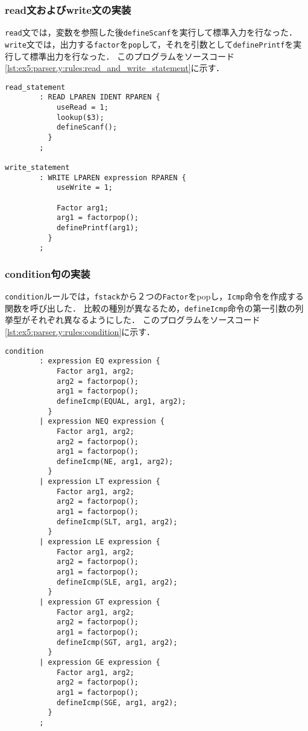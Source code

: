 \documentclass[uplatex]{jsarticle}
\begin{document}
\subsubsection{read文およびwrite文の実装}
\verb#read#文では，変数を参照した後\verb#defineScanf#を実行して標準入力を行なった．
\verb#write#文では，出力する\verb#factor#を\verb#pop#して，それを引数として\verb#definePrintf#を実行して標準出力を行なった．
このプログラムをソースコード\ref{lst:ex5:parser.y:rules:read_and_write_statement}に示す．
\begin{lstlisting}[caption=read文およびwrite文の処理,label=lst:ex5:parser.y:rules:read_and_write_statement]
read_statement
        : READ LPAREN IDENT RPAREN {
            useRead = 1;
            lookup($3);
            defineScanf();
          }
        ;

write_statement
        : WRITE LPAREN expression RPAREN {
            useWrite = 1;

            Factor arg1;
            arg1 = factorpop();
            definePrintf(arg1);
          }
        ;
\end{lstlisting}
\subsubsection{condition句の実装}
\verb#condition#ルールでは，\verb#fstack#から２つの\verb#Factor#をpopし，\verb#Icmp#命令を作成する関数を呼び出した．
比較の種別が異なるため，\verb#defineIcmp#命令の第一引数の列挙型がそれぞれ異なるようにした．
このプログラムをソースコード\ref{lst:ex5:parser.y:rules:condition}に示す．
\begin{lstlisting}[caption=condition句の処理,label=lst:ex5:parser.y:rules:condition]
condition
        : expression EQ expression {
            Factor arg1, arg2;
            arg2 = factorpop();
            arg1 = factorpop();
            defineIcmp(EQUAL, arg1, arg2);
          }
        | expression NEQ expression {
            Factor arg1, arg2;
            arg2 = factorpop();
            arg1 = factorpop();
            defineIcmp(NE, arg1, arg2);
          }
        | expression LT expression {
            Factor arg1, arg2;
            arg2 = factorpop();
            arg1 = factorpop();
            defineIcmp(SLT, arg1, arg2);
          }
        | expression LE expression {
            Factor arg1, arg2;
            arg2 = factorpop();
            arg1 = factorpop();
            defineIcmp(SLE, arg1, arg2);
          }
        | expression GT expression {
            Factor arg1, arg2;
            arg2 = factorpop();
            arg1 = factorpop();
            defineIcmp(SGT, arg1, arg2);
          }
        | expression GE expression {
            Factor arg1, arg2;
            arg2 = factorpop();
            arg1 = factorpop();
            defineIcmp(SGE, arg1, arg2);
          }
        ;
\end{lstlisting}
\end{document}
